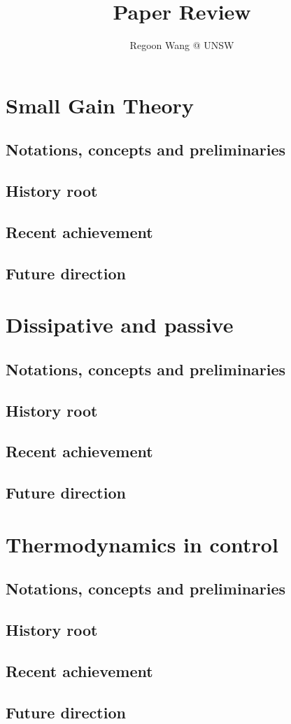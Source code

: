 \documentclass[10pt,a4paper]{report}
\begin{document}
\newcommand{\file}[1]{\textbf{title:} #1 \\}
\title{Paper Review}
\author{Regoon Wang @ UNSW}
\maketitle

\tableofcontents
\chapter{Small Gain Theory}
\section{Notations, concepts and preliminaries}
\section{History root}
\section{Recent achievement}
\section{Future direction}
\cite{Jiang2008}


\chapter{Dissipative and passive}
\section{Notations, concepts and preliminaries}
\section{History root}
\section{Recent achievement}
\section{Future direction}
\chapter{Thermodynamics in control}
\section{Notations, concepts and preliminaries}
\section{History root}
\section{Recent achievement}
\section{Future direction}
\end{document}
